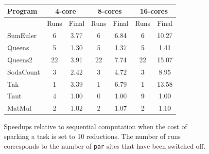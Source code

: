 
\begin{figure}[ht]
\centering
  \begin{tabular}{ |l||c c|c c|c c| }
    \hline
    Program & \multicolumn{2}{c|}{4-core} & \multicolumn{2}{c|}{8-cores} & \multicolumn{2}{c|}{16-cores} \\
    \hline
            & Runs & Final     & Runs & Final      & Runs & Final \\
    \hline
    SumEuler  & 6    & 3.77      & 6    & 6.84       & 6    & 10.27     \\
    Queens    & 5    & 1.30      & 5    & 1.37       & 5    & 1.41  \\
    Queens2   & 22   & 3.91      & 22   & 7.74       & 22   & 15.07   \\
    SodaCount & 3    & 2.42      & 3    & 4.72       & 3    & 8.95    \\
    Tak       & 1    & 3.39      & 1    & 6.79       & 1    & 13.58   \\
    Taut      & 4    & 1.00      & 0    & 1.00       & 9    & 1.00  \\
    MatMul    & 2    & 1.02      & 2    & 1.07       & 2    & 1.10   \\
    \hline
  \end{tabular}
\caption{Speedups relative to sequential computation when the cost of sparking
        a task is set to 10 reductions. The number of runs corresponds to the
        number of \texttt{par} sites that have been switched off.}
\label{table10}
\end{figure}

